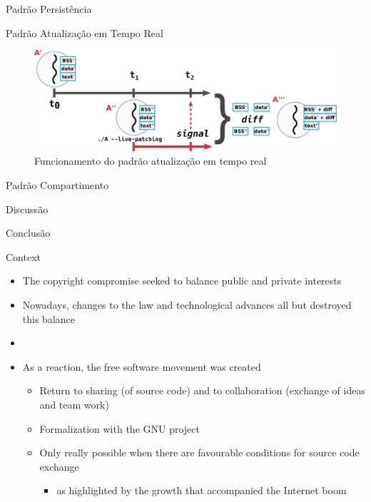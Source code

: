 \documentclass[xcolor={usenames,svgnames,dvipsnames},brazil,english,12pt,aspectratio=149]{beamer}
\begin{document}
\begin{frame}{Padrão Persistência}
\end{frame}

\begin{frame}{Padrão Atualização em Tempo Real}
	\begin{figure}[!h]
		\centering
		\includegraphics[width=\textwidth]{live-patching}
		\caption{Funcionamento do padrão atualização em tempo real}
		\label{fig:atr}
	\end{figure}
\end{frame}

\begin{frame}{Padrão Compartimento}
\end{frame}

\begin{frame}{Discussão}
\end{frame}

\begin{frame}{Conclusão}
\end{frame}

\begin{frame}{Context}
  \begin{itemize}
    \item The copyright compromise seeked to balance public and private interests
    \item Nowadays, changes to the law and technological advances all but destroyed this balance
    \item[]
    \item As a reaction, the free software movement was created
    \begin{itemize}
      \item Return to sharing (of source code) and to collaboration (exchange of ideas and team work)
      \item Formalization with the GNU project
      \item Only really possible when there are favourable conditions for source code exchange
      \begin{itemize}
        \item as highlighted by the growth that accompanied the Internet boom
      \end{itemize}
    \end{itemize}
  \end{itemize}

\end{frame}
\end{document}
